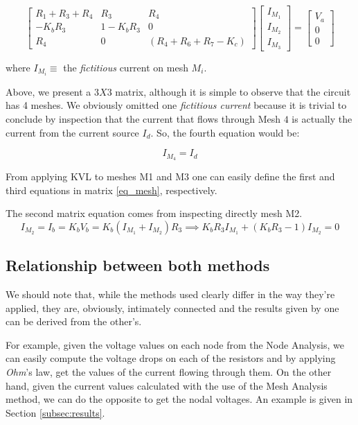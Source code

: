 \begin{equation}
\label{eq_mesh}
\begin{bmatrix}
R_1+R_3+R_4 & R_3 & R_4 \\
-K_bR_3 & 1-K_bR_3 & 0 \\
R_4 & 0 & (R_4+R_6+R_7-K_c)
\end{bmatrix}
\begin{bmatrix}
I_{M_1}\\
I_{M_2} \\
I_{M_3}
\end{bmatrix}
=
\begin{bmatrix}
V_a \\
0 \\
0
\end{bmatrix}
\end{equation}


where $I_{M_i}\equiv$ the \textit{fictitious} current on mesh $M_i$.

Above, we present a $3X3$ matrix, although it is simple to observe that the circuit has 4 meshes. We obviously omitted one \textit{fictitious current} because it is trivial to conclude by inspection that the current that flows through Mesh $4$ is actually the current from the current source $I_d$. So, the fourth equation would be:

\begin{equation}
    I_{M_4}=I_d
\end{equation}

From applying KVL to meshes M1 and M3 one can easily define the first and third equations in matrix \ref{eq_mesh}, respectively.

The second matrix equation comes from inspecting directly mesh M2. 
\begin{equation}
    I_{M_2}= I_b = K_bV_b = K_b(I_{M_1}+I_{M_2})R_3 \implies K_bR_3I_{M_1} + (K_bR_3-1) I_{M_2} = 0
\end{equation}

\pagebreak
\subsection{Relationship between both methods}
\label{subsec:relation_mesh_node}

We should note that, while the methods used clearly differ in the way they're applied, they are, obviously, intimately connected and the results given by one can be derived from the other's.

For example, given the voltage values on each node from the Node Analysis, we can easily compute the voltage drops on each of the resistors and by applying \textit{Ohm}'s law, get the values of the current flowing through them.
On the other hand, given the current values calculated with the use of the Mesh Analysis method, we can do the opposite to get the nodal voltages. An example is given in Section \ref{subsec:results}.

